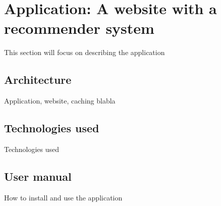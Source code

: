 \chapter{Application: A website with a recommender system}
\label{chap:application}

This section will focus on describing the application

\section{Architecture}
\label{sec:application_architecture}

Application, website, caching blabla

\section{Technologies used}
\label{sec:application_technologies}

Technologies used

\section{User manual}
\label{sec:application_manual}

How to install and use the application
